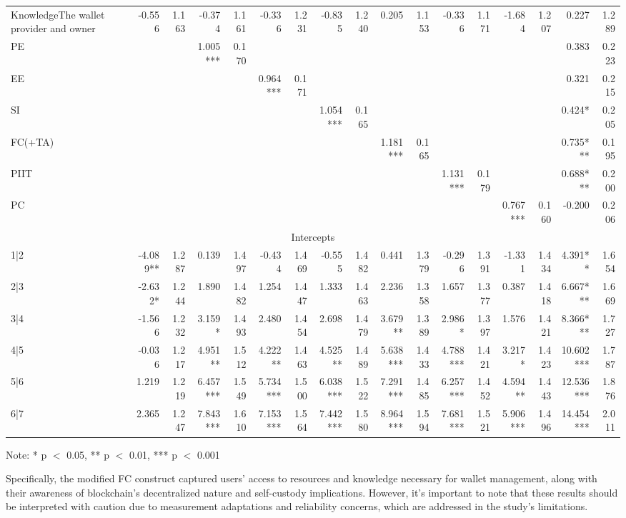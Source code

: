 \documentclass[twocolumn]{article}
\begin{document}
\begin{landscape}
\begin{table}[htbp]
{\begin{tabular}{@{}lrrrrrrrrrrrrrrrr@{}}
KnowledgeThe wallet provider and owner & -0.556 & 1.163 & -0.374 & 1.161 & -0.336 & 1.231 & -0.835 & 1.240 & 0.205 & 1.153 & -0.336 & 1.171 & -1.684 & 1.207 & 0.227 & 1.289 \\
PE & & & 1.005*** & 0.170 & & & & & & & & & & & 0.383 & 0.223 \\
EE & & & & & 0.964*** & 0.171 & & & & & & & & & 0.321 & 0.215 \\
SI & & & & & & & 1.054*** & 0.165 & & & & & & & 0.424* & 0.205 \\
FC(+TA) & & & & & & & & & 1.181*** & 0.165 & & & & & 0.735*** & 0.195 \\
PIIT & & & & & & & & & & & 1.131*** & 0.179 & & & 0.688*** & 0.200 \\
PC & & & & & & & & & & & & & 0.767*** & 0.160 & -0.200 & 0.206 \\
\midrule
\multicolumn{17}{c}{Intercepts} \\
\midrule
1|2 & -4.089** & 1.287 & 0.139 & 1.497 & -0.434 & 1.469 & -0.555 & 1.482 & 0.441 & 1.379 & -0.296 & 1.391 & -1.331 & 1.434 & 4.391** & 1.654 \\
2|3 & -2.632* & 1.244 & 1.890 & 1.482 & 1.254 & 1.447 & 1.333 & 1.463 & 2.236 & 1.358 & 1.657 & 1.377 & 0.387 & 1.418 & 6.667*** & 1.669 \\
3|4 & -1.566 & 1.232 & 3.159* & 1.493 & 2.480 & 1.454 & 2.698 & 1.479 & 3.679** & 1.389 & 2.986* & 1.397 & 1.576 & 1.421 & 8.366*** & 1.727 \\
4|5 & -0.036 & 1.217 & 4.951** & 1.512 & 4.222** & 1.463 & 4.525** & 1.489 & 5.638*** & 1.433 & 4.788*** & 1.421 & 3.217* & 1.423 & 10.602*** & 1.787 \\
5|6 & 1.219 & 1.219 & 6.457*** & 1.549 & 5.734*** & 1.500 & 6.038*** & 1.522 & 7.291*** & 1.485 & 6.257*** & 1.452 & 4.594** & 1.443 & 12.536*** & 1.876 \\
6|7 & 2.365 & 1.247 & 7.843*** & 1.610 & 7.153*** & 1.564 & 7.442*** & 1.580 & 8.964*** & 1.594 & 7.681*** & 1.521 & 5.906*** & 1.496 & 14.454*** & 2.011 \\
\bottomrule
\end{tabular}%
}
\smallskip
\begin{flushleft}
\footnotesize \centering Note: * p $<$ 0.05, ** p $<$ 0.01, *** p $<$ 0.001
\end{flushleft}
\end{table}
\end{landscape}


Specifically, the modified FC construct captured users' access to resources and knowledge necessary for wallet management, along with their awareness of blockchain's decentralized nature and self-custody implications. However, it's important to note that these results should be interpreted with caution due to measurement adaptations and reliability concerns, which are addressed in the study's limitations.
\end{document}
